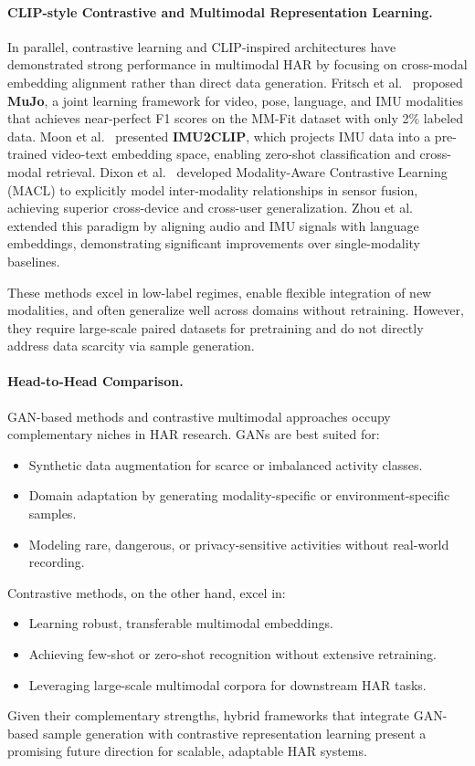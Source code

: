 \paragraph{CLIP-style Contrastive and Multimodal Representation Learning.}
In parallel, contrastive learning and CLIP-inspired architectures have demonstrated strong performance in multimodal HAR by focusing on cross-modal embedding alignment rather than direct data generation. Fritsch et al.~\cite{fritsch2025mujo} proposed \textbf{MuJo}, a joint learning framework for video, pose, language, and IMU modalities that achieves near-perfect F1 scores on the MM-Fit dataset with only 2\% labeled data. Moon et al.~\cite{moon2022imu2clip} presented \textbf{IMU2CLIP}, which projects IMU data into a pre-trained video-text embedding space, enabling zero-shot classification and cross-modal retrieval. Dixon et al.~\cite{dixon2024modality} developed Modality-Aware Contrastive Learning (MACL) to explicitly model inter-modality relationships in sensor fusion, achieving superior cross-device and cross-user generalization. Zhou et al.~\cite{zhou2024cross} extended this paradigm by aligning audio and IMU signals with language embeddings, demonstrating significant improvements over single-modality baselines.

These methods excel in low-label regimes, enable flexible integration of new modalities, and often generalize well across domains without retraining. However, they require large-scale paired datasets for pretraining and do not directly address data scarcity via sample generation.

\paragraph{Head-to-Head Comparison.}
GAN-based methods and contrastive multimodal approaches occupy complementary niches in HAR research. GANs are best suited for:
\begin{itemize}
    \item Synthetic data augmentation for scarce or imbalanced activity classes.
    \item Domain adaptation by generating modality-specific or environment-specific samples.
    \item Modeling rare, dangerous, or privacy-sensitive activities without real-world recording.
\end{itemize}
Contrastive methods, on the other hand, excel in:
\begin{itemize}
    \item Learning robust, transferable multimodal embeddings.
    \item Achieving few-shot or zero-shot recognition without extensive retraining.
    \item Leveraging large-scale multimodal corpora for downstream HAR tasks.
\end{itemize}
Given their complementary strengths, hybrid frameworks that integrate GAN-based sample generation with contrastive representation learning present a promising future direction for scalable, adaptable HAR systems.
